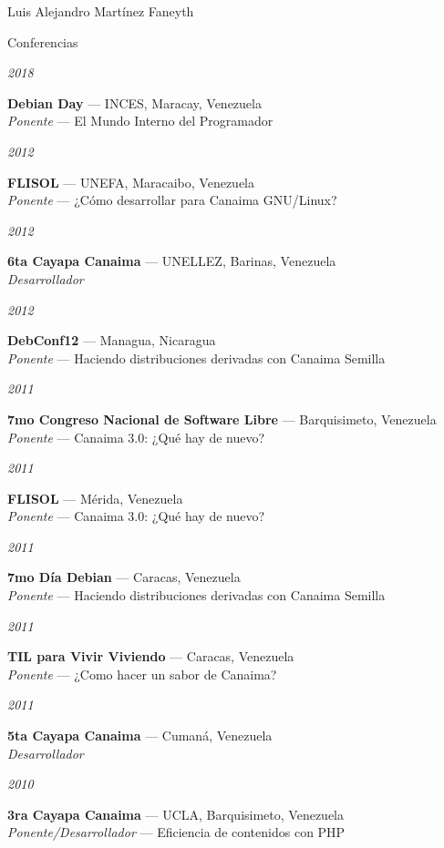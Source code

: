 \documentclass[11pt,letterpaper]{article}
\begin{document}
\begin{cv}{Luis Alejandro Mart\'inez Faneyth}
\begin{cvlist}{Conferencias}
\item[{\parbox[t]{6em}{\textit{\large{2018}}}}]{
	\parbox[t]{\linewidth}{
		\textbf{Debian Day} --- INCES, Maracay, Venezuela\\
		\textit{Ponente} --- El Mundo Interno del Programador
	}
}
\item[{\parbox[t]{6em}{\textit{\large{2012}}}}]{
	\parbox[t]{\linewidth}{
		\textbf{FLISOL} --- UNEFA, Maracaibo, Venezuela\\
		\textit{Ponente} --- ¿C\'omo desarrollar para Canaima GNU/Linux?
	}
}
\item[{\parbox[t]{6em}{\textit{\large{2012}}}}]{
	\parbox[t]{\linewidth}{
		\textbf{6ta Cayapa Canaima} --- UNELLEZ, Barinas, Venezuela\\
		\textit{Desarrollador}
	}
}
\item[{\parbox[t]{6em}{\textit{\large{2012}}}}]{
	\parbox[t]{\linewidth}{
		\textbf{DebConf12} --- Managua, Nicaragua\\
		\textit{Ponente} --- Haciendo distribuciones derivadas con Canaima Semilla
	}
}
\item[{\parbox[t]{6em}{\textit{\large{2011}}}}]{
	\parbox[t]{\linewidth}{
		\textbf{7mo Congreso Nacional de Software Libre} --- Barquisimeto, Venezuela\\
		\textit{Ponente} --- Canaima 3.0: ¿Qu\'e hay de nuevo?
	}
}
\item[{\parbox[t]{6em}{\textit{\large{2011}}}}]{
	\parbox[t]{\linewidth}{
		\textbf{FLISOL} --- M\'erida, Venezuela\\
		\textit{Ponente} --- Canaima 3.0: ¿Qu\'e hay de nuevo?
	}
}
\item[{\parbox[t]{6em}{\textit{\large{2011}}}}]{
	\parbox[t]{\linewidth}{
		\textbf{7mo D\'ia Debian} --- Caracas, Venezuela\\
		\textit{Ponente} --- Haciendo distribuciones derivadas con Canaima Semilla
	}
}
\item[{\parbox[t]{6em}{\textit{\large{2011}}}}]{
	\parbox[t]{\linewidth}{
		\textbf{TIL para Vivir Viviendo} --- Caracas, Venezuela\\
		\textit{Ponente} --- ¿Como hacer un sabor de Canaima?
	}
}
\item[{\parbox[t]{6em}{\textit{\large{2011}}}}]{
	\parbox[t]{\linewidth}{
		\textbf{5ta Cayapa Canaima} --- Cuman\'a, Venezuela\\
		\textit{Desarrollador}
	}
}
\item[{\parbox[t]{6em}{\textit{\large{2010}}}}]{
	\parbox[t]{\linewidth}{
		\textbf{3ra Cayapa Canaima} --- UCLA, Barquisimeto, Venezuela\\
		\textit{Ponente/Desarrollador} --- Eficiencia de contenidos con PHP
	}
}
\end{cvlist}


\end{cv}
\end{document}
